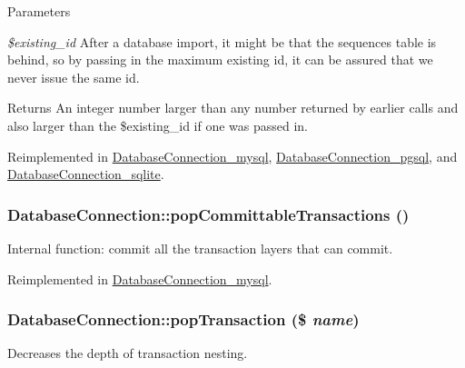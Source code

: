 \begin{DoxyParams}{Parameters}
\item[{\em \$existing\_\-id}]After a database import, it might be that the sequences table is behind, so by passing in the maximum existing id, it can be assured that we never issue the same id.\end{DoxyParams}
\begin{DoxyReturn}{Returns}
An integer number larger than any number returned by earlier calls and also larger than the \$existing\_\-id if one was passed in. 
\end{DoxyReturn}


Reimplemented in \hyperlink{classDatabaseConnection__mysql_a89a5362c5a53f7e2a60e75076a4cba11}{DatabaseConnection\_\-mysql}, \hyperlink{classDatabaseConnection__pgsql_a6098b360df35fec77fd8240348eb6659}{DatabaseConnection\_\-pgsql}, and \hyperlink{classDatabaseConnection__sqlite_ada0053b7801625663994ae1e0ddaabdf}{DatabaseConnection\_\-sqlite}.\hypertarget{classDatabaseConnection_ade8d68cea197dc7703042ab505ed940d}{
\subsubsection[{popCommittableTransactions}]{\setlength{\rightskip}{0pt plus 5cm}DatabaseConnection::popCommittableTransactions ()}}
\label{classDatabaseConnection_ade8d68cea197dc7703042ab505ed940d}
Internal function: commit all the transaction layers that can commit. 

Reimplemented in \hyperlink{classDatabaseConnection__mysql_ad63915bedc73d668f05295b8572a33c0}{DatabaseConnection\_\-mysql}.\hypertarget{classDatabaseConnection_a0bca5087efb85e6480b953cc76ccfcb1}{
\subsubsection[{popTransaction}]{\setlength{\rightskip}{0pt plus 5cm}DatabaseConnection::popTransaction (\$ {\em name})}}
\label{classDatabaseConnection_a0bca5087efb85e6480b953cc76ccfcb1}
Decreases the depth of transaction nesting.

